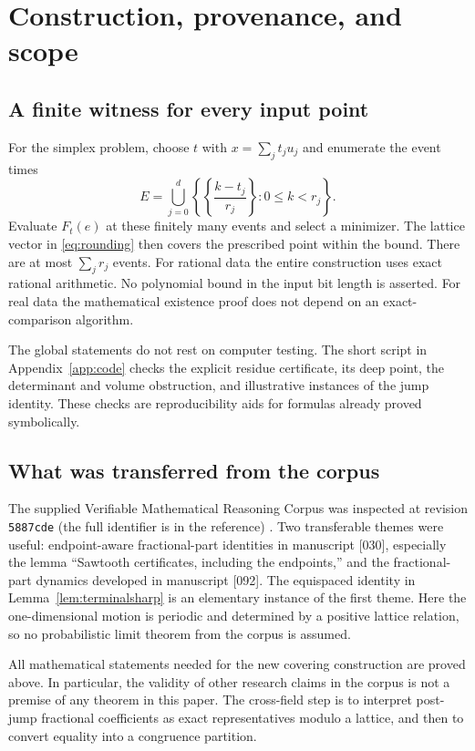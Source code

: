 \documentclass[11pt,a4paper]{article}
\theoremstyle{definition}\newtheorem{definition}[theorem]{Definition}
\theoremstyle{remark}\newtheorem{remark}[theorem]{Remark}
\begin{document}
\section{Construction, provenance, and scope}
\label{sec:scope}
\subsection{A finite witness for every input point}
For the simplex problem, choose $t$ with $x=\sum_jt_ju_j$ and
enumerate the event times
\[
 E=\bigcup_{j=0}^d
 \left\{\left\{\frac{k-t_j}{r_j}\right\}:0\le k<r_j\right\}.
\]
Evaluate $F_t(e)$ at these finitely many events and select a
minimizer. The lattice vector in \eqref{eq:rounding} then covers
the prescribed point within the bound. There are at most
$\sum_jr_j$ events. For rational data the entire construction uses
exact rational arithmetic. No polynomial bound in the input bit
length is asserted. For real data the mathematical existence proof
does not depend on an exact-comparison algorithm.

The global statements do not rest on computer testing. The short
script in Appendix~\ref{app:code} checks the explicit residue
certificate, its deep point, the determinant and volume obstruction,
and illustrative instances of the jump identity. These checks are
reproducibility aids for formulas already proved symbolically.

\subsection{What was transferred from the corpus}
The supplied Verifiable Mathematical Reasoning Corpus was inspected
at revision \texttt{5887cde} (the full identifier is in the reference)
\cite{Corpus}. Two transferable themes were useful: endpoint-aware
fractional-part identities in manuscript [030], especially the lemma
``Sawtooth certificates, including the endpoints,'' and the
fractional-part dynamics developed in manuscript [092].
The equispaced identity in Lemma~\ref{lem:terminalsharp} is an
elementary instance of the first theme. Here the one-dimensional
motion is periodic and determined by a positive lattice relation,
so no probabilistic limit theorem from the corpus is assumed.

All mathematical statements needed for the new covering construction
are proved above. In particular, the validity of other research
claims in the corpus is not a premise of any theorem in this paper.
The cross-field step is to interpret post-jump fractional coefficients
as exact representatives modulo a lattice, and then to convert
equality into a congruence partition.
\end{document}
